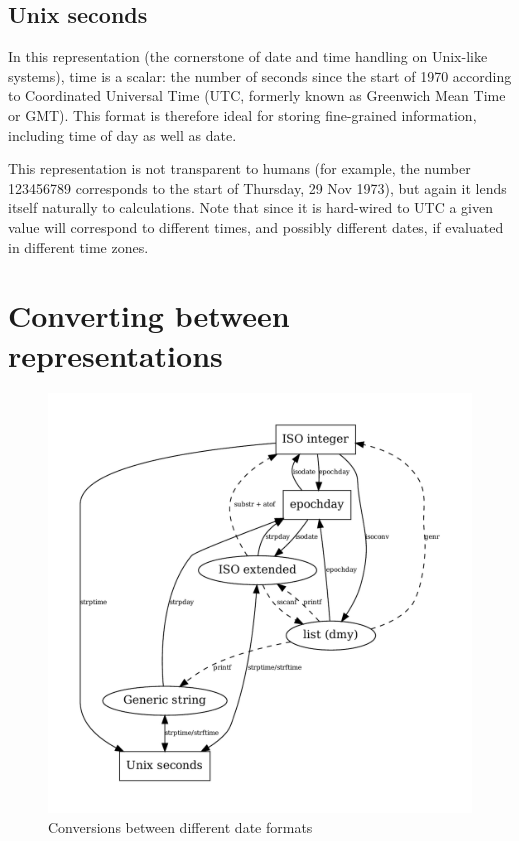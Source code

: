 \subsection{Unix seconds}
\label{sec:cal-seconds}

In this representation (the cornerstone of date and time handling on
Unix-like systems), time is a scalar: the number of seconds since the
start of 1970 according to Coordinated Universal Time (UTC, formerly
known as Greenwich Mean Time or GMT). This format is therefore ideal
for storing fine-grained information, including time of day as well as
date.

This representation is not transparent to humans (for example, the
number 123456789 corresponds to the start of Thursday, 29 Nov 1973),
but again it lends itself naturally to calculations. Note that since
it is hard-wired to UTC a given value will correspond to different
times, and possibly different dates, if evaluated in different time
zones.

\section{Converting between representations}
\label{sec:cal-conversions}

\begin{figure}[htbp]
  \centering
  \includegraphics[scale=0.667]{figures/date-conversion}
  \caption{Conversions between different date formats}
  \label{fig:cal-conversions}
\end{figure}

